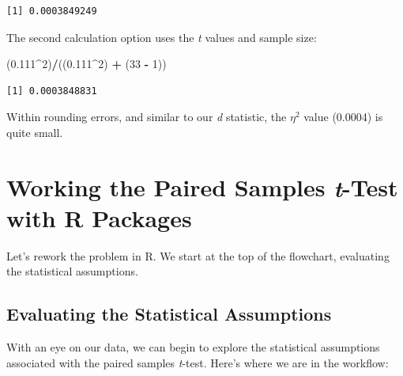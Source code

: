 \documentclass[
  11pt,
]{book}
\newenvironment{Shaded}{\begin{snugshade}}{\end{snugshade}}
\newcommand{\DecValTok}[1]{\textcolor[rgb]{0.06,0.06,0.06}{#1}}
\newcommand{\FloatTok}[1]{\textcolor[rgb]{0.06,0.06,0.06}{#1}}
\newcommand{\NormalTok}[1]{#1}
\newcommand{\SpecialCharTok}[1]{\textcolor[rgb]{0.43,0.43,0.43}{\textbf{#1}}}
\begin{document}
\begin{verbatim}
[1] 0.0003849249
\end{verbatim}

The second calculation option uses the \emph{t} values and sample size:

\begin{Shaded}
\begin{Highlighting}[]
\NormalTok{(}\FloatTok{0.111}\SpecialCharTok{\^{}}\DecValTok{2}\NormalTok{)}\SpecialCharTok{/}\NormalTok{((}\FloatTok{0.111}\SpecialCharTok{\^{}}\DecValTok{2}\NormalTok{) }\SpecialCharTok{+}\NormalTok{ (}\DecValTok{33} \SpecialCharTok{{-}} \DecValTok{1}\NormalTok{))}
\end{Highlighting}
\end{Shaded}

\begin{verbatim}
[1] 0.0003848831
\end{verbatim}

Within rounding errors, and similar to our \emph{d} statistic, the \(\eta^2\) value (0.0004) is quite small.

\hypertarget{working-the-paired-samples-t-test-with-r-packages}{%
\section{\texorpdfstring{Working the Paired Samples \emph{t}-Test with R Packages}{Working the Paired Samples t-Test with R Packages}}\label{working-the-paired-samples-t-test-with-r-packages}}

Let's rework the problem in R. We start at the top of the flowchart, evaluating the statistical assumptions.

\hypertarget{evaluating-the-statistical-assumptions-2}{%
\subsection{Evaluating the Statistical Assumptions}\label{evaluating-the-statistical-assumptions-2}}

With an eye on our data, we can begin to explore the statistical assumptions associated with the paired samples \emph{t}-test. Here's where we are in the workflow:
\end{document}
